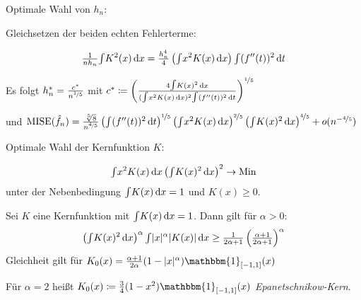 \documentclass{cheat-sheet}
\newcommand{\ind}{\mathbbm{1}} %
\DeclareMathOperator{\MISE}{MISE} %
\begin{document}

Optimale Wahl von $h_n$:

Gleichsetzen der beiden echten Fehlerterme:

\[
  \tfrac{1}{n h_n} {\textstyle \int} K^2(x) \,\mathrm{d} x = \tfrac{h_n^4}{4} \left( {\textstyle \int} x^2 K(x) \,\mathrm{d} x \right) {\textstyle \int} (f''(t))^2 \,\mathrm{d} t
\]

Es folgt $h_n^{*} = \tfrac{c^*}{n^{\nicefrac{1}{5}}}$ mit $c^* \coloneqq \left( \frac{4 {\textstyle \int} K(x)^2 \,\mathrm{d} x}{({\textstyle \int} x^2 K(x) \,\mathrm{d} x)^2 {\textstyle \int} (f''(t))^2 \,\mathrm{d} t} \right)^{\nicefrac{1}{5}}$

und $\MISE(\hat{f}_n) = \tfrac{\sqrt[5]{8}}{n^{\nicefrac{4}{5}}} \left( \IInt{(f''(t))^2}{t} \right)^{\nicefrac{1}{5}} \left( \IInt{x^2 K(x)}{x} \right)^{\nicefrac{2}{5}} \left( \IInt{K(x)^2}{x} \right)^{\nicefrac{4}{5}} + o(n^{- \nicefrac{4}{5}})$

Optimale Wahl der Kernfunktion $K$:

\[
  {\textstyle \int} x^2 K(x) \,\mathrm{d} x \left( {\textstyle \int} K(x)^2 \,\mathrm{d} x \right)^2 \to \text{Min}
\]
unter der Nebenbedingung ${\textstyle \int} K(x) \,\mathrm{d} x = 1$ und $K(x) \geq 0$.

\begin{satz}
  Sei $K$ eine Kernfunktion mit ${\textstyle \int} K(x) \,\mathrm{d} x = 1$.
  Dann gilt für $\alpha > 0$:
  \[
    \left( {\textstyle \int} K(x)^2 \,\mathrm{d} x \right)^\alpha {\textstyle \int} \lvert x\rvert^\alpha \lvert K(x)\rvert \,\mathrm{d} x \geq \tfrac{1}{2 \alpha + 1} \left( \tfrac{\alpha + 1}{2 \alpha + 1} \right)^\alpha
  \]
  Gleichheit gilt für $K_0(x) = \tfrac{\alpha+1}{2 \alpha} (1 - \abs{x}^\alpha) \ind_{\cinterval{-1}{1}} (x)$
\end{satz}

\begin{defn}
  Für $\alpha = 2$ heißt $K_0(x) \coloneqq \tfrac{3}{4} (1 - x^2) \ind_{\cinterval{-1}{1}} (x)$ \emph{Epanetschnikow-Kern}.
\end{defn}

\end{document}
